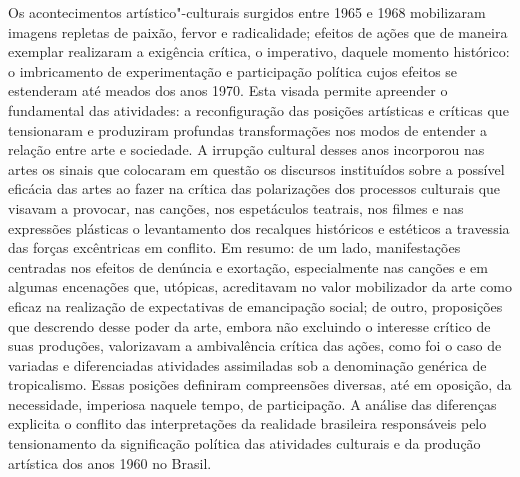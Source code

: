 \movetooddpage
\thispagestyle{empty}
\setcounter{footnote}{0}
\begin{vplace}[0.25]

{\large{}}
\end{vplace}

\pagebreak
\thispagestyle{empty}

\movetooddpage


Os acontecimentos artístico"-culturais surgidos entre 1965 e 1968
mobilizaram imagens repletas de paixão, fervor e radicalidade; efeitos
de ações que de maneira exemplar realizaram a exigência crítica, o
imperativo, daquele momento histórico: o imbricamento de experimentação
e participação política cujos efeitos se estenderam até meados dos anos
1970. Esta visada permite apreender o fundamental das atividades: a
reconfiguração das posições artísticas e críticas que tensionaram e
produziram profundas transformações nos modos de entender a relação
entre arte e sociedade. A irrupção cultural desses anos incorporou nas
artes os sinais que colocaram em questão os discursos instituídos sobre
a possível eficácia das artes ao fazer na crítica das polarizações dos
processos culturais que visavam a provocar, nas canções, nos espetáculos
teatrais, nos filmes e nas expressões plásticas o levantamento dos
recalques históricos e estéticos a travessia das forças excêntricas em
conflito. Em resumo: de um lado, manifestações centradas nos efeitos de
denúncia e exortação, especialmente nas canções e em algumas encenações
que, utópicas, acreditavam no valor mobilizador da arte como eficaz na
realização de expectativas de emancipação social; de outro, proposições
que descrendo desse poder da arte, embora não excluindo o interesse
crítico de suas produções, valorizavam a ambivalência crítica das ações,
como foi o caso de variadas e diferenciadas atividades assimiladas sob a
denominação genérica de tropicalismo. Essas posições definiram
compreensões diversas, até em oposição, da necessidade, imperiosa
naquele tempo, de participação. A análise das diferenças explicita o
conflito das interpretações da realidade brasileira responsáveis pelo
tensionamento da significação política das atividades culturais e da
produção artística dos anos 1960 no Brasil.


